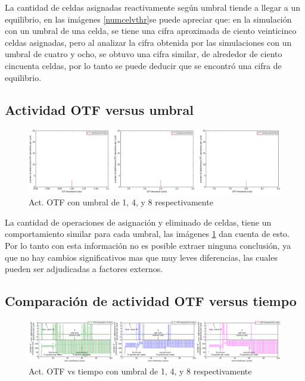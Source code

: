     La cantidad de celdas asignadas reactivamente según umbral tiende a llegar a un equilibrio, en las imágenes \ref{numcelvthr}se puede apreciar que: en la simulación con un umbral de una celda, se tiene una cifra aproximada de ciento veinticinco celdas asignadas, pero al analizar la cifra obtenida por las simulaciones con un umbral de cuatro y ocho, se obtuvo una cifra similar, de alrededor de ciento cincuenta celdas, por lo tanto se puede deducir que se encontró una cifra de equilibrio.


\subsection{Actividad OTF versus umbral}

        \begin{figure}[h]
        \graphicspath{ {imagenes/agrupadas/} }
        \centering
        \includegraphics[width=1.0\textwidth]{otfactvthr.png}
        \caption{Act. OTF con umbral de 1, 4, y 8 respectivamente}
        \label{otfactvthr}
        \end{figure}

    La cantidad de operaciones de asignación y eliminado de celdas, tiene un comportamiento similar para cada umbral, las imágenes \ref{otfactvthr} dan cuenta de esto. Por lo tanto con esta información no es posible extraer ninguna conclusión, ya que no hay cambios significativos mas que muy leves diferencias, las cuales pueden ser adjudicadas a factores externos.

\subsection{Comparación de actividad OTF versus tiempo}

        \begin{figure}[h]
        \graphicspath{ {imagenes/agrupadas/} }
        \centering
        \includegraphics[width=1.0\textwidth]{numcellsotfactivtime.png}
        \caption{Act. OTF vs tiempo con umbral de 1, 4, y 8 respectivamente}
        \label{otfcomp}
        \end{figure}


